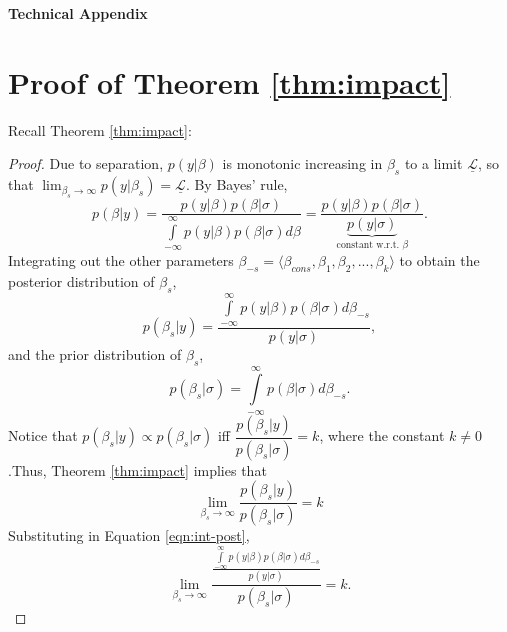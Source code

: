 \documentclass[12pt]{article}
\begin{document}
\clearpage
\begin{appendix}
\begin{center}
\LARGE{\textbf{Technical Appendix}}\vspace{4mm}
\end{center}

\section*{Proof of Theorem \ref{thm:impact}}

Recall Theorem \ref{thm:impact}:

\impact*

\begin{proof}
Due to separation, $p(y|\beta)$ is monotonic increasing in $\beta_s$ to a limit $\underline{\mathscr{L}}$, so that $\displaystyle \lim_{\beta_s \to \infty} p(y | \beta_s) = \underline{\mathscr{L}}$. By Bayes' rule, 
\begin{equation*}
p(\beta | y) = \dfrac{p(y | \beta)p(\beta | \sigma)}{\int\limits_{-\infty}^{\infty}p(y | \beta)p(\beta | \sigma)d\beta} = \dfrac{p(y | \beta)p(\beta | \sigma)}{\underbrace{p(y | \sigma)}_{\text{constant w.r.t. }\beta}}. 
\end{equation*}
Integrating out the other parameters $\beta_{-s} = \langle \beta_{cons}, \beta_1, \beta_2, ..., \beta_k \rangle$ to obtain the posterior distribution of $\beta_s$, 
\begin{equation}\label{eqn:int-post}
p(\beta_s | y) = \dfrac{\int\limits_{-\infty}^{\infty}p(y | \beta)p(\beta | \sigma)d\beta_{-s}}{p(y | \sigma)}, 
\end{equation}
and the prior distribution of $\beta_s$, 
\begin{equation*}
p(\beta_s | \sigma) = \int\limits_{-\infty}^{\infty}p(\beta | \sigma)d\beta_{-s}.
\end{equation*}
Notice that $p(\beta_s | y) \propto p(\beta_s | \sigma)$ iff $\dfrac{p(\beta_s | y)}{p(\beta_s | \sigma)} = k$, where the constant $k \neq 0$.Thus, Theorem \ref{thm:impact} implies that
\begin{equation*}
\lim _{\beta_s \to \infty} \dfrac{p(\beta_s | y)}{p(\beta_s | \sigma)} = k
\end{equation*}
Substituting in Equation \ref{eqn:int-post},
\begin{equation*}
\lim _{\beta_s \to \infty} \dfrac{\frac{\int\limits_{-\infty}^{\infty}p(y | \beta)p(\beta | \sigma)d\beta_{-s}}{p(y | \sigma)}}{p(\beta_s | \sigma)} = k.
\end{equation*}

\end{proof}
\end{appendix}
\end{document}
